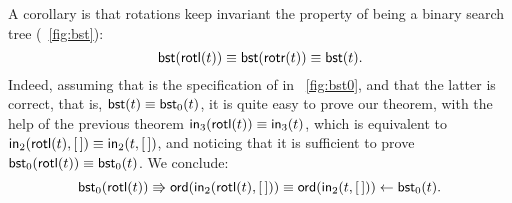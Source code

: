 A corollary is that rotations keep invariant the property of being a
binary search tree (\fig~\vref{fig:bst}):
\begin{equation*}
\abovedisplayskip=5pt
\belowdisplayskip=5pt
\fun{bst}(\fun{rotl}(t)) \equiv \fun{bst}(\fun{rotr}(t)) \equiv \fun{bst}(t).
\end{equation*}
Indeed, assuming that  is the specification of
 in \fig~\vref{fig:bst0}, and that the latter is
correct, that is, \(\textsf{bst}(t) \equiv \textsf{bst}_0(t)\), it is quite
easy to prove our theorem, with the help of the previous theorem
\(\textsf{in}_3(\textsf{rotl}(t)) \equiv \textsf{in}_3(t)\), which is
equivalent to \(\textsf{in}_2(\textsf{rotl}(t),[\,]) \equiv
\textsf{in}_2(t,[\,])\), and noticing that it is sufficient to prove
\(\textsf{bst}_0(\textsf{rotl}(t)) \equiv \textsf{bst}_0(t)\). We conclude:
\begin{equation*}
\textsf{bst}_0(\textsf{rotl}(t))
\Rrightarrow \textsf{ord}(\textsf{in}_2(\textsf{rotl}(t),[\,]))
\equiv \textsf{ord}(\textsf{in}_2(t,[\,]))
\leftarrow \textsf{bst}_0(t).
\end{equation*}


